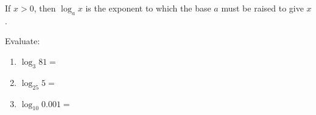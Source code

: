 \begin{frame}
If $x > 0$, then $\log_a x$ is the exponent to which the base $a$ must be raised to give $x$.
\begin{example}%
Evaluate:
\begin{enumerate}
\item<1-| alert@2-3> $\log_3 81 =$ 
\item<1-| alert@4-5> $\log_{25} 5 =$ 
\item<1-| alert@6-7> $\log_{10} 0.001 =$ 
\end{enumerate}
\end{example}
\end{frame}
